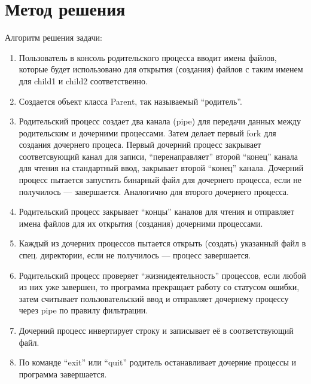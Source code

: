 \section{Метод решения}

Алгоритм решения задачи:

\begin{enumerate}
\item Пользователь в консоль родительского процесса вводит имена файлов, которые будет использовано для открытия (создания) файлов с таким именем для child1 и child2 соответственно.

\item Создается объект класса Parent, так называемый ``родитель''.

\item Родительский процесс создает два канала (pipe) для передачи данных между родительским и дочерними процессами. 
Затем делает первый fork для создания дочернего процеса. Первый дочерний процесс закрывает соответсвующий канал для записи, ``перенаправляет'' второй ``конец'' канала для чтения на стандартный ввод, закрывает второй ``конец'' канала. 
Дочерний процесс пытается запустить бинарный файл для дочернего процесса, если не получилось --- завершается. Аналогично для второго дочернего процесса.

\item Родительский процесс закрывает ``концы'' каналов для чтения и отправляет имена файлов для их открытия (создания) дочерними процессами.

\item Каждый из дочерних процессов пытается открыть (создать) указанный файл в спец. директории, если не получилось --- процесс завершается.

\item Родительский процесс проверяет ``жизнидеятельность'' процессов, если любой из них уже завершен, то программа прекращает работу со статусом ошибки, 
затем считывает пользовательский ввод и отправляет дочернему процессу через pipe по правилу фильтрации.

\item Дочерний процесс инвертирует строку и записывает её в соответствующий файл.

\item По команде ``exit'' или ``quit'' родитель останавливает дочерние процессы и программа завершается.
\end{enumerate}

\vspace{10\baselineskip}

